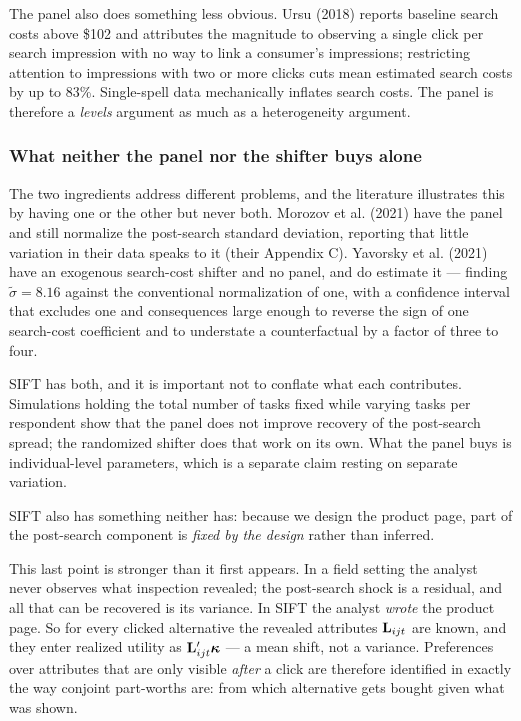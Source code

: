 \documentclass[
  letterpaper,
  DIV=11,
  numbers=noendperiod]{scrartcl}
\begin{document}
The panel also does something less obvious. Ursu (2018) reports baseline
search costs above \$102 and attributes the magnitude to observing a
single click per search impression with no way to link a consumer's
impressions; restricting attention to impressions with two or more
clicks cuts mean estimated search costs by up to 83\%. Single-spell data
mechanically inflates search costs. The panel is therefore a
\emph{levels} argument as much as a heterogeneity argument.

\subsubsection{What neither the panel nor the shifter buys
alone}\label{what-neither-the-panel-nor-the-shifter-buys-alone}

The two ingredients address different problems, and the literature
illustrates this by having one or the other but never both. Morozov et
al. (2021) have the panel and still normalize the post-search standard
deviation, reporting that little variation in their data speaks to it
(their Appendix C). Yavorsky et al. (2021) have an exogenous search-cost
shifter and no panel, and do estimate it --- finding
\(\tilde\sigma = 8.16\) against the conventional normalization of one,
with a confidence interval that excludes one and consequences large
enough to reverse the sign of one search-cost coefficient and to
understate a counterfactual by a factor of three to four.

SIFT has both, and it is important not to conflate what each
contributes. Simulations holding the total number of tasks fixed while
varying tasks per respondent show that the panel does not improve
recovery of the post-search spread; the randomized shifter does that
work on its own. What the panel buys is individual-level parameters,
which is a separate claim resting on separate variation.

SIFT also has something neither has: because we design the product page,
part of the post-search component is \emph{fixed by the design} rather
than inferred.

This last point is stronger than it first appears. In a field setting
the analyst never observes what inspection revealed; the post-search
shock is a residual, and all that can be recovered is its variance. In
SIFT the analyst \emph{wrote} the product page. So for every clicked
alternative the revealed attributes \(\mathbf{L}_{ijt}\) are known, and they
enter realized utility as \(\mathbf{L}_{ijt}'\boldsymbol{\kappa}\) --- a mean shift, not
a variance. Preferences over attributes that are only visible
\emph{after} a click are therefore identified in exactly the way
conjoint part-worths are: from which alternative gets bought given what
was shown.
\end{document}
